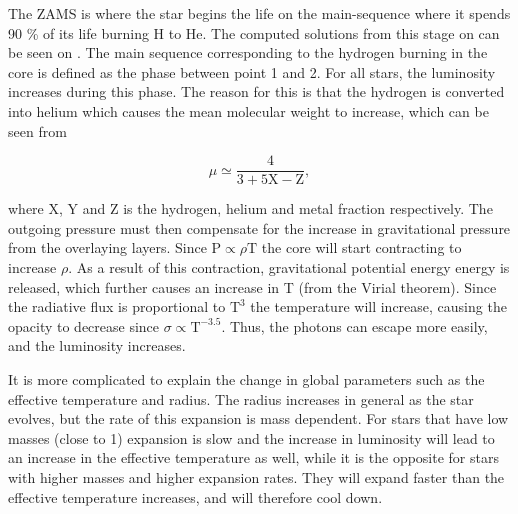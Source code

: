 The ZAMS is where the star begins the life on the main-sequence where it spends 90 \% of its life burning H to He. The computed solutions from this stage on can be seen on . The main sequence corresponding to the hydrogen burning in the core is defined as the phase between point 1 and 2. For all stars, the luminosity increases during this phase. The reason for this is that the hydrogen is converted into helium which causes the mean molecular weight to increase, which can be seen from

\begin{equation}
\label{meanmol}
\mu \simeq \frac{4}{3+5\text{X}-\text{Z}},
\end{equation}

\noindent where X, Y and Z is the hydrogen, helium and metal fraction respectively. The outgoing pressure must then compensate for the increase in gravitational pressure from the overlaying layers. Since $\text{P} \propto \rho \text{T}$ the core will start contracting to increase $\rho$. As a result of this contraction, gravitational potential energy energy is released, which further causes an increase in T (from the Virial theorem). Since the radiative flux is proportional to $\text{T}^{3}$ the temperature will increase, causing the opacity to decrease since $\sigma \propto \text{T}^{-3.5}$. Thus, the photons can escape more easily, and the luminosity increases. 

It is more complicated to explain the change in global parameters such as the effective temperature and radius. The radius increases in general as the star evolves, but the rate of this expansion is mass dependent. For stars that have low masses (close to 1\msun ) expansion is slow and the increase in luminosity will lead to an increase in the effective temperature as well, while it is the opposite for stars with higher masses and higher expansion rates. They will expand faster than the effective temperature increases, and will therefore cool down. 

